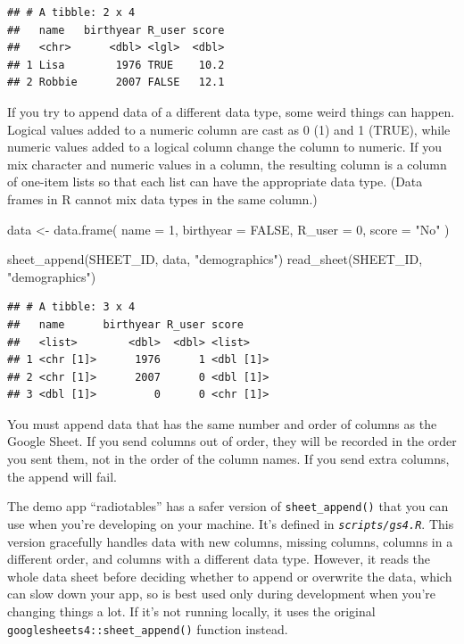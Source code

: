 \documentclass[
  oneside]{book}
\newenvironment{Shaded}{\begin{snugshade}}{\end{snugshade}}
\newcommand{\AttributeTok}[1]{\textcolor[rgb]{0.77,0.63,0.00}{#1}}
\newcommand{\ConstantTok}[1]{\textcolor[rgb]{0.00,0.00,0.00}{#1}}
\newcommand{\DecValTok}[1]{\textcolor[rgb]{0.00,0.00,0.81}{#1}}
\newcommand{\FunctionTok}[1]{\textcolor[rgb]{0.00,0.00,0.00}{#1}}
\newcommand{\NormalTok}[1]{#1}
\newcommand{\OtherTok}[1]{\textcolor[rgb]{0.56,0.35,0.01}{#1}}
\newcommand{\StringTok}[1]{\textcolor[rgb]{0.31,0.60,0.02}{#1}}
\begin{document}
\begin{verbatim}
## # A tibble: 2 x 4
##   name   birthyear R_user score
##   <chr>      <dbl> <lgl>  <dbl>
## 1 Lisa        1976 TRUE    10.2
## 2 Robbie      2007 FALSE   12.1
\end{verbatim}

If you try to append data of a different data type, some weird things can happen. Logical values added to a numeric column are cast as \DecValTok{0} (\DecValTok{1}) and \DecValTok{1} (\ConstantTok{TRUE}), while numeric values added to a logical column change the column to numeric. If you mix character and numeric values in a column, the resulting column is a column of one-item lists so that each list can have the appropriate data type. (Data frames in R cannot mix data types in the same column.)

\begin{Shaded}
\begin{Highlighting}[]
\NormalTok{data }\OtherTok{\textless{}{-}} \FunctionTok{data.frame}\NormalTok{(}
  \AttributeTok{name =} \DecValTok{1}\NormalTok{,}
  \AttributeTok{birthyear =} \ConstantTok{FALSE}\NormalTok{,}
  \AttributeTok{R\_user =} \DecValTok{0}\NormalTok{,}
  \AttributeTok{score =} \StringTok{"No"}
\NormalTok{)}

\FunctionTok{sheet\_append}\NormalTok{(SHEET\_ID, data, }\StringTok{"demographics"}\NormalTok{)}
\FunctionTok{read\_sheet}\NormalTok{(SHEET\_ID, }\StringTok{"demographics"}\NormalTok{)}
\end{Highlighting}
\end{Shaded}

\begin{verbatim}
## # A tibble: 3 x 4
##   name      birthyear R_user score    
##   <list>        <dbl>  <dbl> <list>   
## 1 <chr [1]>      1976      1 <dbl [1]>
## 2 <chr [1]>      2007      0 <dbl [1]>
## 3 <dbl [1]>         0      0 <chr [1]>
\end{verbatim}

\begin{dangerous}
You must append data that has the same number and order of columns as the Google Sheet. If you send columns out of order, they will be recorded in the order you sent them, not in the order of the column names. If you send extra columns, the append will fail.

\end{dangerous}

The demo app ``radiotables'' has a safer version of \texttt{sheet\_append}\texttt{()} that you can use when you're developing on your machine. It's defined in \textit{\texttt{scripts/gs4.R}}. This version gracefully handles data with new columns, missing columns, columns in a different order, and columns with a different data type. However, it reads the whole data sheet before deciding whether to append or overwrite the data, which can slow down your app, so is best used only during development when you're changing things a lot. If it's not running locally, it uses the original \texttt{googlesheets4::sheet\_append}\texttt{()} function instead.
\end{document}
